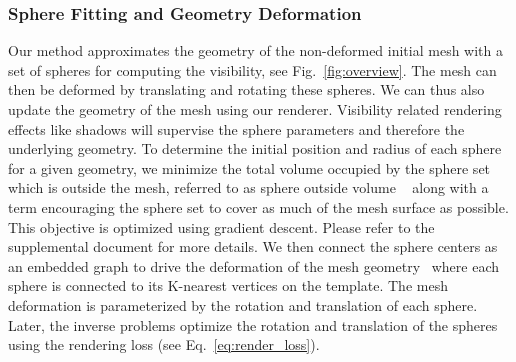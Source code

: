 \subsubsection{Sphere Fitting and Geometry Deformation}
%
\label{spherefitting}
%
Our method approximates the geometry of the non-deformed initial mesh with a set of spheres for computing the visibility, see Fig.~\ref{fig:overview}.
%
The mesh can then be deformed by translating and rotating these spheres. 
%
We can thus also update the geometry of the mesh using our renderer.
%
Visibility related rendering effects like shadows will supervise the sphere parameters and therefore the underlying geometry. 
%
To determine the initial position and radius of each sphere for a given geometry, we minimize the total volume occupied by the sphere set which is outside the mesh, referred to as sphere outside volume ~\cite{wang2006variational} along with a term encouraging the sphere set to cover as much of the mesh surface as possible. 
%
This objective is optimized using gradient descent. 
%
Please refer to the supplemental document for more details.
%
We then connect the sphere centers as an embedded graph to drive the deformation of the mesh geometry~\cite{sumner2007embedded} where each sphere is connected to its K-nearest vertices on the template. 
%
The mesh deformation is parameterized by the rotation and translation of each sphere. 
%
Later, the inverse problems optimize the rotation and translation of the spheres using the rendering loss (see Eq.~\ref{eq:render_loss}).
%
%

